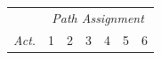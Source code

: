 \begin{figure}[t]
\begin{center}
\begin{tabular}{l|cccccc}
& \multicolumn{6}{c}{{\em Path Assignment}}  \\
{\em Act.} & 1 & 2 & 3 & 4 & 5 & 6\\ \hline


\end{tabular}
\end{center}
\end{figure}
